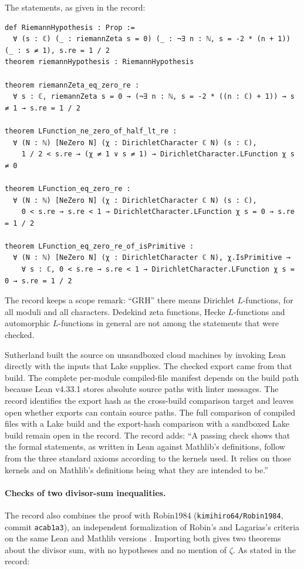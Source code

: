 \noindent\begin{minipage}{\linewidth}
The statements, as given in the record:
\begin{Verbatim}
def RiemannHypothesis : Prop :=
  ∀ (s : ℂ) (_ : riemannZeta s = 0) (_ : ¬∃ n : ℕ, s = -2 * (n + 1)) (_ : s ≠ 1), s.re = 1 / 2
theorem riemannHypothesis : RiemannHypothesis

theorem riemannZeta_eq_zero_re :
  ∀ s : ℂ, riemannZeta s = 0 → (¬∃ n : ℕ, s = -2 * ((n : ℂ) + 1)) → s ≠ 1 → s.re = 1 / 2

theorem LFunction_ne_zero_of_half_lt_re :
  ∀ (N : ℕ) [NeZero N] (χ : DirichletCharacter ℂ N) (s : ℂ),
    1 / 2 < s.re → (χ ≠ 1 ∨ s ≠ 1) → DirichletCharacter.LFunction χ s ≠ 0

theorem LFunction_eq_zero_re :
  ∀ (N : ℕ) [NeZero N] (χ : DirichletCharacter ℂ N) (s : ℂ),
    0 < s.re → s.re < 1 → DirichletCharacter.LFunction χ s = 0 → s.re = 1 / 2

theorem LFunction_eq_zero_re_of_isPrimitive :
  ∀ (N : ℕ) [NeZero N] (χ : DirichletCharacter ℂ N), χ.IsPrimitive →
    ∀ s : ℂ, 0 < s.re → s.re < 1 → DirichletCharacter.LFunction χ s = 0 → s.re = 1 / 2
\end{Verbatim}
\end{minipage}

The record keeps a scope remark: ``GRH'' there means Dirichlet $L$-functions, for all moduli and all
characters. Dedekind zeta functions, Hecke $L$-functions and automorphic $L$-functions in general are
not among the statements that were checked.

Sutherland built the source on unsandboxed cloud machines by invoking Lean directly with the inputs
that Lake supplies. The checked export came from that build. The complete per-module compiled-file
manifest depends on the build path because Lean v4.33.1 stores absolute source paths with linter
messages. The record identifies the export hash as the cross-build comparison target and leaves
open whether exports can contain source paths. The full comparison of compiled files with a Lake
build and the export-hash comparison with a sandboxed Lake build remain open in the record. The
record adds: ``A passing check shows that the formal statements, as written in Lean against
Mathlib's definitions, follow from the three standard axioms according to the kernels used. It
relies on those kernels and on Mathlib's definitions being what they are intended to be.''

\FloatBarrier
\paragraph{Checks of two divisor-sum inequalities.} The record also combines the proof with
Robin1984 (\texttt{kimihiro64/Robin1984}, commit \texttt{acab1a3}), an independent formalization of
Robin's and Lagarias's criteria on the same Lean and Mathlib versions \cite{sutherland-1255}.
Importing both gives two theorems about the divisor sum, with no hypotheses and no mention of
$\zeta$. As stated in the record:

